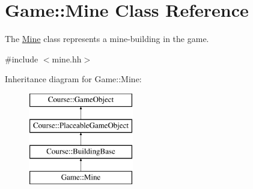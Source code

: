 \hypertarget{classGame_1_1Mine}{\section{Game\-:\-:Mine Class Reference}
\label{classGame_1_1Mine}
}


The \hyperlink{classGame_1_1Mine}{Mine} class represents a mine-\/building in the game.  




{\ttfamily \#include $<$mine.\-hh$>$}

Inheritance diagram for Game\-:\-:Mine\-:\begin{figure}[H]
\begin{center}
\leavevmode
\includegraphics[height=4.000000cm]{classGame_1_1Mine}
\end{center}
\end{figure}
